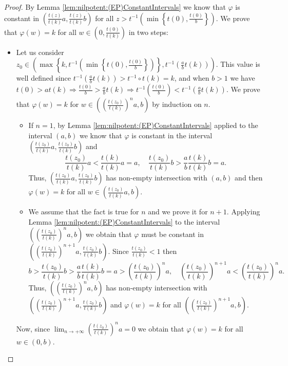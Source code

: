 \begin{proof}
	By Lemma \ref{lem:nilpotent:(EP)ConstantIntervals} we know that $\varphi$ is constant in $\left(\frac{t(z)}{t(k)}a,\frac{t(z)}{t(k)}b\right)$ for all $z > t^{-1}\left(\min\left\{t(0),\frac{t(0)}{b}\right\}\right)$. We prove that $\varphi(w)=k$ for all $w \in \left(0,\frac{t(0)}{t(k)}\right)$ in two steps:
	\begin{itemize}
		\item Let us consider $z_0 \in \left(\max \left \{ k,t^{-1}\left(\min \left \{ t(0),\frac{t(0)}{b}\right \}\right)\right \}, t^{-1}\left(\frac{a}{b}t(k)\right)\right)$. This value is well defined since $t^{-1}\left(\frac{a}{b}t(k)\right) > t^{-1} \circ t(k)=k$, and when $b>1$ we have $t(0)>at(k) \Rightarrow \frac{t(0)}{b}>\frac{a}{b}t(k) \Rightarrow  t^{-1} \left(\frac{t(0)}{b}\right)<t^{-1} \left(\frac{a}{b}t(k)\right)$.
		We prove that $\varphi(w)=k$ for $w \in \left(\left(\frac{t(z_0)}{t(k)}\right)^na,b\right)$ by induction on $n$.
		\begin{itemize}
			\item If $n=1$, by Lemma \ref{lem:nilpotent:(EP)ConstantIntervals} applied to the interval $(a,b)$ we know that $\varphi$ is constant in the interval $\left(\frac{t(z_0)}{t(k)}a,\frac{t(z_0)}{t(k)}b\right)$ and
			$$\frac{t(z_0)}{t(k)}a < \frac{t(k)}{t(k)}a = a, \quad \frac{t(z_0)}{t(k)}b > \frac{a}{b} \frac{t(k)}{t(k)}b =a.$$
			Thus, $\left(\frac{t(z_0)}{t(k)}a,\frac{t(z_0)}{t(k)}b\right)$ has non-empty intersection with $(a,b)$ and then $\varphi(w)=k$ for all $w \in \left(\frac{t(z_0)}{t(k)}a,b\right)$.
			\item We assume that the fact is true for $n$ and we prove it for $n+1$. Applying Lemma \ref{lem:nilpotent:(EP)ConstantIntervals} to the interval $\left(\left(\frac{t(z_0)}{t(k)}\right)^na ,b\right)$ we obtain that $\varphi$ must be constant in $\left(\left(\frac{t(z_0)}{t(k)}\right)^{n+1}a ,\frac{t(z_0)}{t(k)}b\right)$. Since $\frac{t(z_0)}{t(k)}<1$ then
			$$b > \frac{t(z_0)}{t(k)}b > \frac{a}{b}\frac{t(k)}{t(k)}b=a > \left(\frac{t(z_0)}{t(k)}\right)^n a, \quad \left(\frac{t(z_0)}{t(k)}\right)^{n+1}a < \left(\frac{t(z_0)}{t(k)}\right)^{n}a.$$
			Thus,  $\left(\left(\frac{t(z_0)}{t(k)}\right)^na ,b\right)$ has non-empty intersection with $\left(\left(\frac{t(z_0)}{t(k)}\right)^{n+1}a ,\frac{t(z_0)}{t(k)}b\right)$ and $\varphi(w)=k$ for all $\left(\left(\frac{t(z_0)}{t(k)}\right)^{n+1}a ,b\right)$. 
		\end{itemize}
		Now, since $\displaystyle \lim_{n \to + \infty} \left(\frac{t(z_0)}{t(k)}\right)^na=0$ we obtain that $\varphi(w)=k$ for all $w \in (0,b)$.

\end{itemize}
\end{proof}
